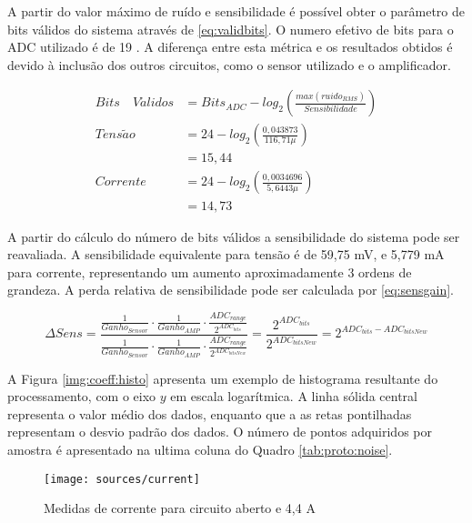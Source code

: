 		A partir do valor máximo de ruído e sensibilidade é possível obter o parâmetro de bits válidos do sistema através de \eqref{eq:validbits}. O numero efetivo de bits para o ADC utilizado é de 19 \cite[][p.7]{ads1259a}. A diferença entre esta métrica e os resultados obtidos é devido à inclusão dos outros circuitos, como o sensor utilizado e o amplificador.

		\begin{align}
			Bits\quad V\acute{a}lidos &= Bits_{ADC} - log_2\left(\frac{max(ruido_{RMS})}{Sensibilidade}\right)	\label{eq:validbits}	\\[12pt]
			Tens\tilde{a}o 			&= 24 - log_2\left(\frac{0,043873}{116,71\mu}\right) \\
									&= 15,44	\label{eq:voltbits}						\\[12pt]
			Corrente				&= 24 - log_2\left(\frac{0,0034696}{5,6443\mu}\right) \\
									&= 14,73	\label{eq:currbits}
		\end{align}

		A partir do cálculo do número de bits válidos a sensibilidade do sistema pode ser reavaliada. A sensibilidade equivalente para tensão é de 59,75 mV, e 5,779 mA para corrente, representando um aumento aproximadamente 3 ordens de grandeza. A perda relativa de sensibilidade pode ser calculada por \eqref{eq:sensgain}.

		\begin{equation}
		\label{eq:sensgain}
			\Delta Sens = \frac{\frac{1}{Ganho_{Sensor}} \cdot \frac{1}{Ganho_{AMP}} \cdot \frac{ADC_{range}}{2^{ADC_{bits}}}}{\frac{1}{Ganho_{Sensor}} \cdot \frac{1}{Ganho_{AMP}} \cdot \frac{ADC_{range}}{2^{ADC_{bitsNew}}}} = \frac{2^{ADC_{bits}}}{2^{ADC_{bitsNew}}} = 2^{ADC_{bits} - ADC_{bitsNew}}
		\end{equation}

		A Figura \ref{img:coeff:histo} apresenta um exemplo de histograma resultante do processamento, com o eixo $y$ em escala logarítmica. A linha sólida central representa o valor médio dos dados, enquanto que a as retas pontilhadas representam o desvio padrão dos dados. O número de pontos adquiridos por amostra é apresentado na ultima coluna do Quadro \ref{tab:proto:noise}.

		\begin{figure}[h]
			\caption{Medidas de corrente para circuito aberto e 4,4 A}
			\label{img:coeff:measex}
			\centering
			\texttt{[image: sources/current]}
		\end{figure}


